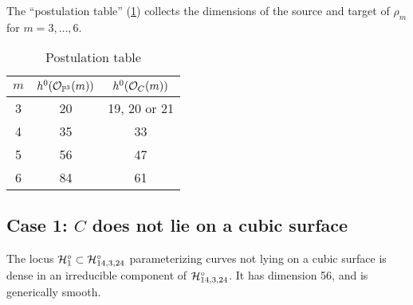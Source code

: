  The ``postulation table'' (\ref{postulation table})
collects the dimensions of the source and target of  $\rho_m$ for $m = 3, \dots, 6$. 
\begin{table}\label{postulation table}
\begin{center}\begin{tabular}{ c | c | c }
 $m$ & $h^0(\cO_{\PP^3}(m))$&$h^0(\cO_C(m))$  \\
 \hline
 3 & 20& 19, 20 or 21  \\
 4 & 35& 33  \\
 5 & 56& 47  \\
 6 & 84& 61 
\end{tabular}
\end{center}
\caption{Postulation table\label{postulation table}}
\end{table}

\subsection{Case 1: $C$ does not lie on a cubic surface}

\begin{proposition}\label{mumford example H1}
The locus $\cH^\circ_1 \subset \cH^\circ_{14,3,24}$ parameterizing curves not lying on a cubic surface is dense in an irreducible component of  $\cH^\circ_{14,3,24}$. It has dimension 56, and is generically smooth.
\end{proposition} 
 
